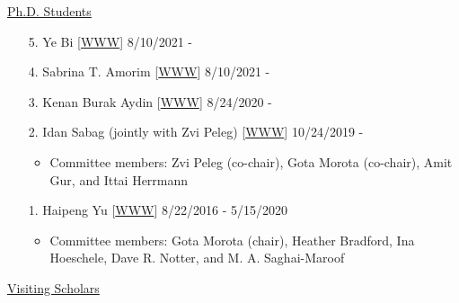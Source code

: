 \documentclass[margin,line,10pt]{res}
\begin{document}
\begin{resume}
\begin{flushleft}
\hspace{0.2cm} \underline{Ph.D. Students}
\end{flushleft}
\begin{enumerate}


  \item [5.] Ye Bi [\textcolor{blue}{\href{https://yebi.netlify.app/}{WWW}}]  \hfill  8/10/2021 -

    \vspace{0.3cm}
    
   \item [4.] Sabrina T. Amorim [\textcolor{blue}{\href{https://sabrinaam.github.io/}{WWW}}]  \hfill  8/10/2021 -

     \vspace{0.3cm}
     
  \item [3.] Kenan Burak Aydin [\textcolor{blue}{\href{}{WWW}}]  \hfill  8/24/2020 -

    \vspace{0.3cm}

    
  \item [2.] Idan Sabag (jointly with Zvi Peleg) [\textcolor{blue}{\href{https://twitter.com/idansabag7}{WWW}}]  \hfill  10/24/2019 -

    \begin{itemize}
     \item  Committee members: Zvi Peleg (co-chair), Gota Morota (co-chair), Amit Gur, and Ittai Herrmann 
    \end{itemize}
    
    \vspace{0.3cm}

  \item [1.] Haipeng Yu [\textcolor{blue}{\href{https://haipengu.github.io/}{WWW}}]  \hfill 8/22/2016 - 5/15/2020
    \begin{itemize}
     \item  Committee members: Gota Morota (chair), Heather Bradford, Ina Hoeschele, Dave R. Notter, and M. A. Saghai-Maroof
    \end{itemize}
\end{enumerate}








\begin{flushleft}
\hspace{0.2cm} \underline{Visiting Scholars}
\end{flushleft}
\begin{enumerate}


\end{enumerate}
\end{resume}
\end{document}
